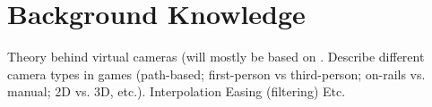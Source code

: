 \section{Background Knowledge}
Theory behind virtual cameras (will mostly be based on \cite{haigh-hutchinson_real-time_2009}.
Describe different camera types in games (path-based; first-person vs third-person; on-rails vs. manual; 2D vs. 3D, etc.).
Interpolation
Easing (filtering)
Etc.

